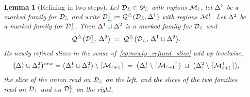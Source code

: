 \documentclass[a4paper, 12pt]{article}
\makeatletter
\newcommand{\quadriF}{\mathcal{Q}^{\triangle}}                   %
\newcommand{\green}{\color{ForestGreen}}
\DeclareRobustCommand{\simplexsubsetTwo}[2][]{\Delta\ifx\@empty#1\@empty\else^{#1}\fi_{#2}}
\renewcommand{\l}{{\green\ell}}
\renewcommand{\L}{{\green L}}
\newcommand{\M}{\mathcal{M}}
\newtheorem{lemma}[theorem]{Lemma}
\theoremstyle{definition}
\theoremstyle{plain}
\numberwithin{equation}{section}
\newcommand{\ancestorPatch}[1]{\lceil #1 \rceil}
\DeclareRobustCommand{\domseq}[1][]{\mathcal{D}\ifx\@empty#1\@empty\else_{#1}\fi}
\newcommand{\alldomseqs}{\mathscr{D}}
\makeatother
\begin{document}
\begin{lemma}[Refining in two steps]
    \label{lemma:face_quadrisection_composition}
    Let $\domseq[\L] \in \alldomseqs_\L$ with regions $\M_\l$, let $\simplexsubsetTwo[1]{}$ be a marked family for $\domseq[\L]$ and write $\domseq[\L]^1 \coloneq \quadriF(\domseq[\L], \simplexsubsetTwo[1]{})$ with regions $\M^1_\l$. Let $\simplexsubsetTwo[2]{}$ be a marked family for $\domseq[\L]^1$. Then $\simplexsubsetTwo[1]{} \cup \simplexsubsetTwo[2]{}$ is a marked family for $\domseq[\L]$ and
    \begin{equation}
        \label{eq:face_quadrisection_composition}
        \quadriF \big( \domseq[\L]^1, \, \simplexsubsetTwo[2]{} \big) \; = \; \quadriF \big( \domseq[\L], \, \simplexsubsetTwo[1]{} \cup \simplexsubsetTwo[2]{} \big) .
    \end{equation}
    Its newly refined slices in the sense of~\eqref{eq:newly_refined_slice} add up levelwise,
    \begin{equation}
        \label{eq:new_slices_add}
        \big( \simplexsubsetTwo[1]{\l} \cup \simplexsubsetTwo[2]{\l} \big){}^{\mathrm{new}} = \big( \simplexsubsetTwo[1]{\l} \cup \simplexsubsetTwo[2]{\l} \big) \setminus \ancestorPatch{\M_{\l+1}} \; = \; \big( \simplexsubsetTwo[1]{\l} \setminus \ancestorPatch{\M_{\l+1}} \big) \; \sqcup \; \big( \simplexsubsetTwo[2]{\l} \setminus \ancestorPatch{\M^1_{\l+1}} \big) ,
    \end{equation}
    the slice of the union read on $\domseq[\L]$ on the left, and the slices of the two families read on $\domseq[\L]$ and on $\domseq[\L]^1$ on the right.
\end{lemma}
\end{document}

